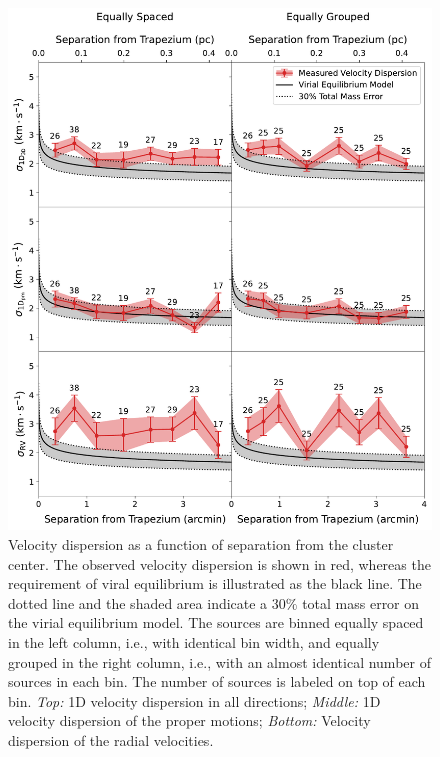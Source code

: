 \documentclass[12pt]{ucsddissertation}
\begin{document}
\begin{CJK*}{UTF8}{gbsn}
\begin{figure}[htb!]
    \centering
    \includegraphics[width=0.8\linewidth]{figures/chapter1/vdisp_vs_sep.pdf}
    \caption[Velocity dispersion vs. separation of the ONC]{Velocity dispersion as a function of separation from the cluster center. The observed velocity dispersion is shown in red, whereas the requirement of viral equilibrium is illustrated as the black line. The dotted line and the shaded area indicate a $30\%$ total mass error on the virial equilibrium model. The sources are binned equally spaced in the left column, i.e., with identical bin width, and equally grouped in the right column, i.e., with an almost identical number of sources in each bin. The number of sources is labeled on top of each bin. \textit{Top:} 1D velocity dispersion in all directions; \textit{Middle:} 1D velocity dispersion of the proper motions; \textit{Bottom:} Velocity dispersion of the radial velocities.}
    \label{fig:vdisp}
\end{figure}


\end{CJK*}
\end{document}
